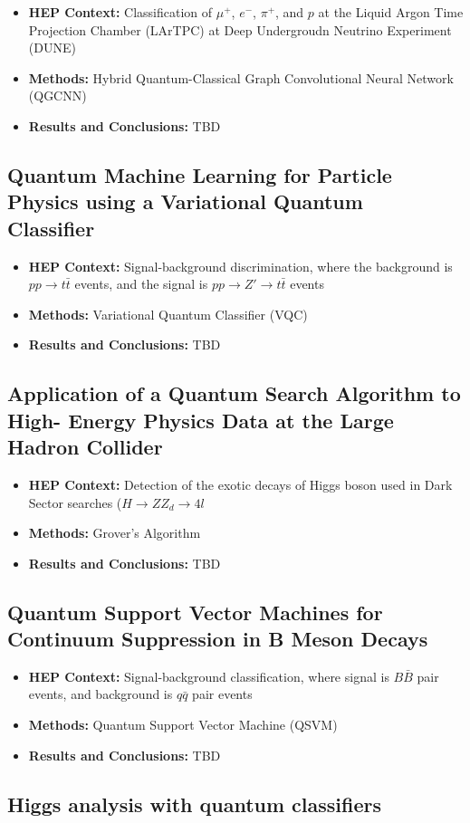 \begin{itemize}
	\item \textbf{HEP Context: }Classification of $\mu^+$, $e^-$, $\pi^+$, and $p$ at the Liquid Argon Time Projection Chamber (LArTPC) at Deep Undergroudn Neutrino Experiment (DUNE)
	\item \textbf{Methods: }Hybrid Quantum-Classical Graph Convolutional Neural Network (QGCNN)
	\item \textbf{Results and Conclusions: }TBD
\end{itemize}\subsection{Quantum Machine Learning for Particle Physics using a Variational Quantum Classifier~\cite{Blance:2020nhl}}
\begin{itemize}
	\item \textbf{HEP Context: }Signal-background discrimination, where the background is $pp \rightarrow t\bar{t}$ events, and the signal is $pp \rightarrow Z' \rightarrow t\bar{t}$ events
	\item \textbf{Methods: }Variational Quantum Classifier (VQC)
	\item \textbf{Results and Conclusions: }TBD
\end{itemize}\subsection{Application of a Quantum Search Algorithm to High- Energy Physics Data at the Large Hadron Collider~\cite{Armenakas:2020ymp}}
\begin{itemize}
	\item \textbf{HEP Context: }Detection of the exotic decays of Higgs boson used in Dark Sector searches ($H \rightarrow ZZ_d \rightarrow 4l$
	\item \textbf{Methods: }Grover's Algorithm
	\item \textbf{Results and Conclusions: }TBD
\end{itemize}\subsection{Quantum Support Vector Machines for Continuum Suppression in B Meson Decays~\cite{Heredge:2021vww}}
\begin{itemize}
	\item \textbf{HEP Context: }Signal-background classification, where signal is $B\bar{B}$ pair events, and background is $q\bar{q}$ pair events
	\item \textbf{Methods: }Quantum Support Vector Machine (QSVM)
	\item \textbf{Results and Conclusions: }TBD
\end{itemize}\subsection{Higgs analysis with quantum classifiers~\cite{Belis:2021zqi}}
